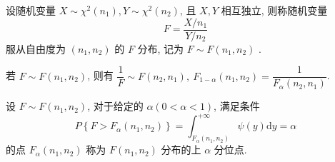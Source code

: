 \begin{definition}[$F$ 分布]
    设随机变量 $ X \sim \chi^{2}\left(n_{1}\right), Y \sim \chi^{2}\left(n_{2}\right)$, 且 $ X, Y $ 相互独立, 则称随机变量
    $$F=\frac{X / n_{1}}{Y / n_{2}}$$
    服从自由度为 $ \left(n_{1}, n_{2}\right) $ 的 $ F $ 分布, 记为 $ F \sim F\left(n_{1}, n_{2}\right)$ .
\end{definition}

\begin{theorem}
    若 $ F \sim F\left(n_{1}, n_{2}\right) $, 则有 $ \dfrac{1}{F} \sim F\left(n_{2}, n_{1}\right) ,~F_{1-\alpha}\left(n_{1}, n_{2}\right)=\dfrac{1}{F_{\alpha}\left(n_{2}, n_{1}\right)}$.
\end{theorem}

\begin{theorem}
    设 $ F \sim F\left(n_{1}, n_{2}\right) $, 对于给定的 $ \alpha(0<\alpha<1) $, 满足条件
    $$P\left\{F>F_{\alpha}\left(n_{1}, n_{2}\right)\right\}=\int_{F_{\alpha}\left(n_{1}, n_{2}\right)}^{+\infty} \psi(y) \mathrm{d} y=\alpha$$
    的点 $ F_{\alpha}\left(n_{1}, n_{2}\right) $ 称为 $ F\left(n_{1}, n_{2}\right) $ 分布的上 $ \alpha $ 分位点.
\end{theorem}

